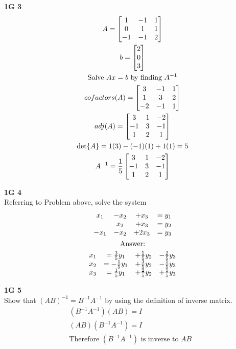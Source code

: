 \documentclass[11pt]{article}
\begin{document}
    \begin{problem}
        \textbf{1G 3}\\
        \begin{gather*}
            A = \bmqty{1 & -1 & 1\\
            0 & 1 & 1 \\
            -1 & -1 & 2}\\
            b = \bmqty{ 2 \\ 0 \\ 3 }\\
            \text{Solve $Ax=b$ by finding $A^{-1}$}\\
            cofactors(A)=\bmqty{3 & -1 & 1 \\
            1 & 3 & 2\\
            -2 & -1 & 1}\\
            adj(A)=\bmqty{3 & 1 & -2 \\
            -1 & 3 & -1 \\
            1 & 2 & 1}\\
            \det{A}= 1(3) - (-1)(1) + 1(1)= 5\\
            A^{-1}=\frac{1}{5}\bmqty{3 & 1 & -2 \\
            -1 & 3 & -1 \\
            1 & 2 & 1}
        \end{gather*}
    \end{problem}
    \begin{problem}
        \textbf{1G 4}\\
        Referring to Problem above, solve the system\\
        \begin{gather*}
            \mqty{x_1 & - x_2 & + x_3 & = y_1 \\
            & x_2 & + x_3 & = y_2 \\
            -x_1 & -x_2 & + 2x_3 & = y_3}\\
            \text{Answer:}\\
            \mqty{x_1 & = \frac{3}{5}y_1 & +\frac{1}{5}y_2 & -\frac{2}{5}y_3 \\
            x_2 &= -\frac{1}{5}y_1 & +\frac{3}{5}y_2 & -\frac{1}{5}y_3 \\
            x_3 & = \frac{1}{5}y_1 & + \frac{2}{5}y_2 & + \frac{1}{5}y_3}
        \end{gather*}
    \end{problem}
    \begin{problem}
        \textbf{1G 5}\\
        Show that $(AB)^{-1} = B^{-1} A^{-1}$ by using the definition of inverse matrix.\\
        \begin{gather*}
            (B^{-1} A^{-1})(AB) = I\\
            (AB)(B^{-1} A^{-1}) = I\\
            \text{Therefore $(B^{-1} A^{-1})$ is inverse to $AB$ }
        \end{gather*}
    \end{problem}
\end{document}
